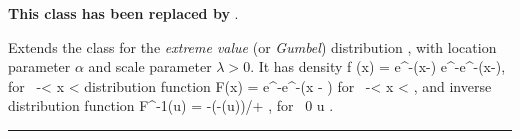 
\textbf{This class has been replaced by }.

Extends the class  for
the {\em extreme value\/} (or \emph{Gumbel}) distribution
\cite[page 2]{tJOH95b}, with location parameter
$\alpha$ and scale parameter $\lambda > 0$.
It has density
\eq f (x) = \lambda e^{-\lambda(x-\alpha)} e^{-e^{-\lambda(x-\alpha)}},
 \qquad \qquad  \mbox{for } -\infty < x < \infty\latex{,}
\endeq
distribution function
\eq
   F(x) = e^{-e^{-\lambda (x - \alpha)}}
\qquad \qquad  \mbox{for } -\infty < x < \infty,  
\endeq
and inverse distribution function
\eq
   F^{-1}(u) = -\ln (-\ln (u))/\lambda + \alpha,
     \qquad\mbox{for }  0 \le u .
\endeq

\bigskip\hrule

